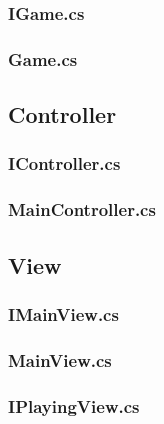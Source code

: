 \subsubsection{IGame.cs}
\newpage
\subsubsection{Game.cs}

\newpage
\subsection{Controller}
\subsubsection{IController.cs}
\newpage
\subsubsection{MainController.cs}

\newpage
\subsection{View}
\subsubsection{IMainView.cs}
\newpage
\subsubsection{MainView.cs}
\newpage
\subsubsection{IPlayingView.cs}
\newpage
